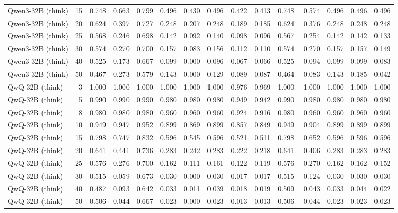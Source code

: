 \documentclass[acmsmall,screen,review,anonymous]{acmart}
\begin{document}
\begin{landscape}
\begin{longtable}{p{4.1cm}r*{13}{r}}
Qwen3-32B (think) & 15 & 0.748 & 0.663 & 0.799 & 0.496 & 0.430 & 0.496 & 0.422 & 0.413 & 0.748 & 0.574 & 0.496 & 0.496 & 0.496 \\
Qwen3-32B (think) & 20 & 0.624 & 0.397 & 0.727 & 0.248 & 0.207 & 0.248 & 0.189 & 0.185 & 0.624 & 0.376 & 0.248 & 0.248 & 0.248 \\
Qwen3-32B (think) & 25 & 0.568 & 0.246 & 0.698 & 0.142 & 0.092 & 0.140 & 0.098 & 0.096 & 0.567 & 0.254 & 0.142 & 0.142 & 0.133 \\
Qwen3-32B (think) & 30 & 0.574 & 0.270 & 0.700 & 0.157 & 0.083 & 0.156 & 0.112 & 0.110 & 0.574 & 0.270 & 0.157 & 0.157 & 0.149 \\
Qwen3-32B (think) & 40 & 0.525 & 0.173 & 0.667 & 0.099 & 0.000 & 0.096 & 0.067 & 0.066 & 0.525 & 0.094 & 0.099 & 0.099 & 0.083 \\
Qwen3-32B (think) & 50 & 0.467 & 0.273 & 0.579 & 0.143 & 0.000 & 0.129 & 0.089 & 0.087 & 0.464 & -0.083 & 0.143 & 0.185 & 0.042 \\
QwQ-32B (think) & 3 & 1.000 & 1.000 & 1.000 & 1.000 & 1.000 & 1.000 & 0.976 & 0.969 & 1.000 & 1.000 & 1.000 & 1.000 & 1.000 \\
QwQ-32B (think) & 5 & 0.990 & 0.990 & 0.990 & 0.980 & 0.980 & 0.980 & 0.949 & 0.942 & 0.990 & 0.980 & 0.980 & 0.980 & 0.980 \\
QwQ-32B (think) & 8 & 0.980 & 0.980 & 0.980 & 0.960 & 0.960 & 0.960 & 0.924 & 0.916 & 0.980 & 0.960 & 0.960 & 0.960 & 0.960 \\
QwQ-32B (think) & 10 & 0.949 & 0.947 & 0.952 & 0.899 & 0.869 & 0.899 & 0.857 & 0.849 & 0.949 & 0.904 & 0.899 & 0.899 & 0.899 \\
QwQ-32B (think) & 15 & 0.798 & 0.747 & 0.832 & 0.596 & 0.545 & 0.596 & 0.521 & 0.511 & 0.798 & 0.652 & 0.596 & 0.596 & 0.596 \\
QwQ-32B (think) & 20 & 0.641 & 0.441 & 0.736 & 0.283 & 0.242 & 0.283 & 0.222 & 0.218 & 0.641 & 0.406 & 0.283 & 0.283 & 0.283 \\
QwQ-32B (think) & 25 & 0.576 & 0.276 & 0.700 & 0.162 & 0.111 & 0.161 & 0.122 & 0.119 & 0.576 & 0.270 & 0.162 & 0.162 & 0.152 \\
QwQ-32B (think) & 30 & 0.515 & 0.059 & 0.673 & 0.030 & 0.000 & 0.030 & 0.017 & 0.017 & 0.515 & 0.124 & 0.030 & 0.030 & 0.030 \\
QwQ-32B (think) & 40 & 0.487 & 0.093 & 0.642 & 0.033 & 0.011 & 0.039 & 0.018 & 0.019 & 0.509 & 0.043 & 0.033 & 0.044 & 0.022 \\
QwQ-32B (think) & 50 & 0.506 & 0.044 & 0.667 & 0.023 & 0.000 & 0.023 & 0.013 & 0.013 & 0.506 & 0.044 & 0.023 & 0.023 & 0.023 \\

\end{longtable}
\end{landscape}
\end{document}
